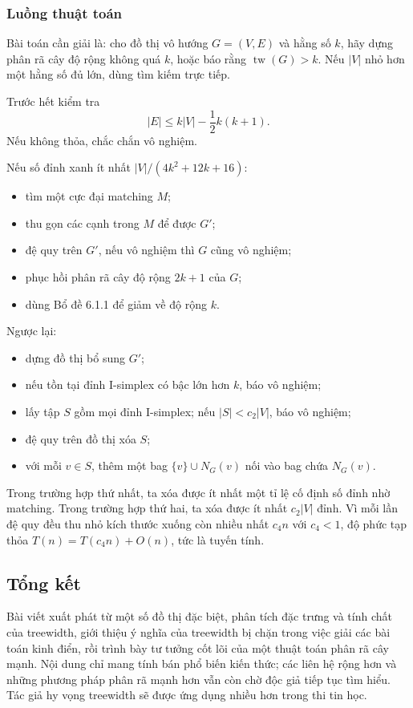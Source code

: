 \documentclass[11pt]{article}
\begin{document}
\subsubsection{Luồng thuật toán}

Bài toán cần giải là: cho đồ thị vô hướng $G=(V,E)$ và hằng số $k$, hãy dựng
phân rã cây độ rộng không quá $k$, hoặc báo rằng $\operatorname{tw}(G)>k$.
Nếu $|V|$ nhỏ hơn một hằng số đủ lớn, dùng tìm kiếm trực tiếp.

Trước hết kiểm tra
\[
  |E|\le k|V|-\frac12 k(k+1).
\]
Nếu không thỏa, chắc chắn vô nghiệm.

Nếu số đỉnh xanh ít nhất $|V|/(4k^2+12k+16)$:
\begin{itemize}
  \item tìm một cực đại matching $M$;
  \item thu gọn các cạnh trong $M$ để được $G'$;
  \item đệ quy trên $G'$, nếu vô nghiệm thì $G$ cũng vô nghiệm;
  \item phục hồi phân rã cây độ rộng $2k+1$ của $G$;
  \item dùng Bổ đề 6.1.1 để giảm về độ rộng $k$.
\end{itemize}

Ngược lại:
\begin{itemize}
  \item dựng đồ thị bổ sung $G'$;
  \item nếu tồn tại đỉnh I-simplex có bậc lớn hơn $k$, báo vô nghiệm;
  \item lấy tập $S$ gồm mọi đỉnh I-simplex; nếu $|S|<c_2|V|$, báo vô nghiệm;
  \item đệ quy trên đồ thị xóa $S$;
  \item với mỗi $v\in S$, thêm một bag $\{v\}\cup N_G(v)$ nối vào bag chứa
  $N_G(v)$.
\end{itemize}

Trong trường hợp thứ nhất, ta xóa được ít nhất một tỉ lệ cố định số đỉnh nhờ
matching. Trong trường hợp thứ hai, ta xóa được ít nhất $c_2|V|$ đỉnh. Vì mỗi
lần đệ quy đều thu nhỏ kích thước xuống còn nhiều nhất $c_4 n$ với $c_4<1$, độ
phức tạp thỏa $T(n)=T(c_4n)+O(n)$, tức là tuyến tính.

\subsection{Tổng kết}

Bài viết xuất phát từ một số đồ thị đặc biệt, phân tích đặc trưng và tính chất
của treewidth, giới thiệu ý nghĩa của treewidth bị chặn trong việc giải các bài
toán kinh điển, rồi trình bày tư tưởng cốt lõi của một thuật toán phân rã cây
mạnh. Nội dung chỉ mang tính bán phổ biến kiến thức; các liên hệ rộng hơn và
những phương pháp phân rã mạnh hơn vẫn còn chờ độc giả tiếp tục tìm hiểu. Tác
giả hy vọng treewidth sẽ được ứng dụng nhiều hơn trong thi tin học.
\end{document}
